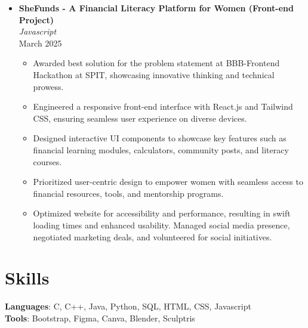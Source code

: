 \documentclass{article}
\begin{document}
\begin{itemize}[leftmargin=*, topsep=0pt]
    \item \textbf{SheFunds - A Financial Literacy Platform for Women (Front-end Project)} \\
    \textit{Javascript} \\
    March 2025
    \begin{itemize}[leftmargin=*, topsep=0pt]
        \item Awarded best solution for the problem statement at BBB-Frontend Hackathon at SPIT, showcasing innovative thinking and technical prowess.
        \item Engineered a responsive front-end interface with React.js and Tailwind CSS, ensuring seamless user experience on diverse devices.
        \item Designed interactive UI components to showcase key features such as financial learning modules, calculators, community posts, and literacy courses.
        \item Prioritized user-centric design to empower women with seamless access to financial resources, tools, and mentorship programs.
        \item Optimized website for accessibility and performance, resulting in swift loading times and enhanced usability. Managed social media presence, negotiated marketing deals, and volunteered for social initiatives.
    \end{itemize}
\end{itemize}

\section*{Skills}
\textbf{Languages}: C, C++, Java, Python, SQL, HTML, CSS, Javascript \\
\textbf{Tools}: Bootstrap, Figma, Canva, Blender, Sculptris
\end{document}
